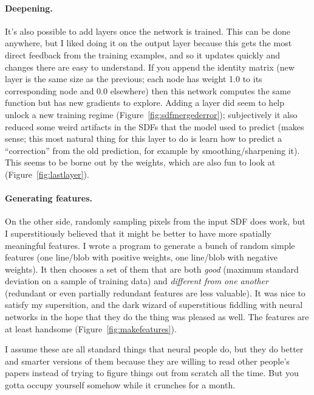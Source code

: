 \documentclass[twocolumn]{article} %
\begin{document}
\paragraph{Deepening.} It's also possible to add layers once the
network is trained. This can be done anywhere, but I liked doing it on
the output layer because this gets the most direct feedback from the
training examples, and so it updates quickly and changes there are
easy to understand. If you append the identity matrix (new layer is
the same size as the previous; each node has weight 1.0 to its
corresponding node and 0.0 elsewhere) then this network computes
the same function but has new gradients to explore. Adding a layer
did seem to help unlock a new training regime
(Figure~\ref{fig:sdfmergederror}); subjectively it also reduced
some weird artifacts in the SDFs that the model used to predict (makes
sense; this most natural thing for this layer to do is learn how to
predict a ``correction'' from the old prediction, for example
by smoothing/sharpening it). This seems to be borne out by the
weights, which are also fun to look at (Figure~\ref{fig:lastlayer}).

\paragraph{Generating features.} On the other side, randomly sampling
pixels from the input SDF does work, but I superstitiously believed
that it might be better to have more spatially meaningful features. I
wrote a program to generate a bunch of random simple features (one
line/blob with positive weights, one line/blob with negative weights).
It then chooses a set of them that are both {\em good} (maximum
standard deviation on a sample of training data) and {\em different
  from one another} (redundant or even partially redundant features
are less valuable). It was nice to satisfy my supersition, and the
dark wizard of superstitious fiddling with neural networks in the
hope that they do the thing was pleased as well. The features are
at least handsome (Figure~\ref{fig:makefeatures}).

I assume these are all standard things that neural people do, but they
do better and smarter versions of them because they are willing to
read other people's papers instead of trying to figure things out from
scratch all the time. But you gotta occupy yourself somehow while it
crunches for a month.
\end{document}

